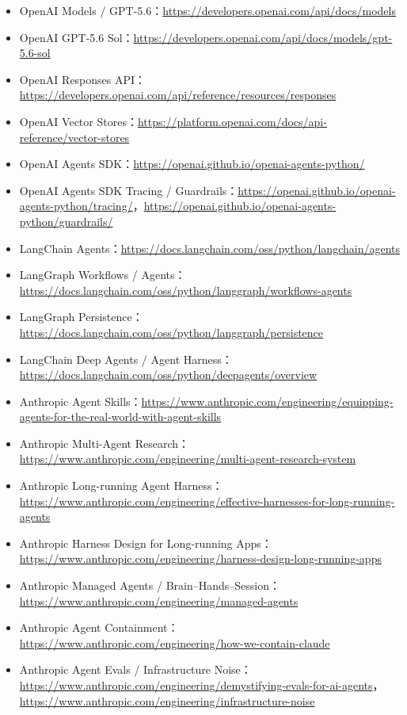 \documentclass[profile=standard,twoside=false]{ipara-handbook}
\begin{document}
\begin{itemize}
  \item OpenAI Models / GPT-5.6：\url{https://developers.openai.com/api/docs/models}
  \item OpenAI GPT-5.6 Sol：\url{https://developers.openai.com/api/docs/models/gpt-5.6-sol}
  \item OpenAI Responses API：\url{https://developers.openai.com/api/reference/resources/responses}
  \item OpenAI Vector Stores：\url{https://platform.openai.com/docs/api-reference/vector-stores}
  \item OpenAI Agents SDK：\url{https://openai.github.io/openai-agents-python/}
  \item OpenAI Agents SDK Tracing / Guardrails：\url{https://openai.github.io/openai-agents-python/tracing/}，\url{https://openai.github.io/openai-agents-python/guardrails/}
  \item LangChain Agents：\url{https://docs.langchain.com/oss/python/langchain/agents}
  \item LangGraph Workflows / Agents：\url{https://docs.langchain.com/oss/python/langgraph/workflows-agents}
  \item LangGraph Persistence：\url{https://docs.langchain.com/oss/python/langgraph/persistence}
  \item LangChain Deep Agents / Agent Harness：\url{https://docs.langchain.com/oss/python/deepagents/overview}
  \item Anthropic Agent Skills：\url{https://www.anthropic.com/engineering/equipping-agents-for-the-real-world-with-agent-skills}
  \item Anthropic Multi-Agent Research：\url{https://www.anthropic.com/engineering/multi-agent-research-system}
  \item Anthropic Long-running Agent Harness：\url{https://www.anthropic.com/engineering/effective-harnesses-for-long-running-agents}
  \item Anthropic Harness Design for Long-running Apps：\url{https://www.anthropic.com/engineering/harness-design-long-running-apps}
  \item Anthropic Managed Agents / Brain--Hands--Session：\url{https://www.anthropic.com/engineering/managed-agents}
  \item Anthropic Agent Containment：\url{https://www.anthropic.com/engineering/how-we-contain-claude}
  \item Anthropic Agent Evals / Infrastructure Noise：\url{https://www.anthropic.com/engineering/demystifying-evals-for-ai-agents}，\url{https://www.anthropic.com/engineering/infrastructure-noise}

\end{itemize}
\end{document}

